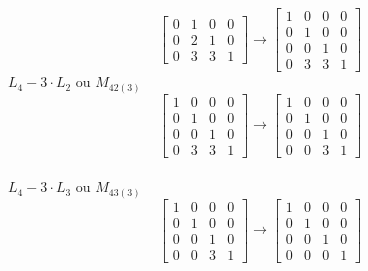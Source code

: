\documentclass[leqno]{article}
\begin{document}
\begin{enumerate}
\begin{sol}
$$\begin{bmatrix}
			0 & 1 & 0 & 0 \\
			0 & 2 & 1 & 0 \\
			0 & 3 & 3 & 1 
		\end{bmatrix} \rightarrow 
		\begin{bmatrix} 
			1 & 0 & 0 & 0 \\
			0 & 1 & 0 & 0 \\
			0 & 0 & 1 & 0 \\
			0 & 3 & 3 & 1 
		\end{bmatrix}$$
		$L_4 - 3 \cdot L_2$ ou $M_{42(3)}$ \\
		$$	\begin{bmatrix} 
			1 & 0 & 0 & 0 \\
			0 & 1 & 0 & 0 \\
			0 & 0 & 1 & 0 \\
			0 & 3 & 3 & 1  
		\end{bmatrix} \rightarrow 
		\begin{bmatrix} 
			1 & 0 & 0 & 0 \\
			0 & 1 & 0 & 0 \\
			0 & 0 & 1 & 0 \\
			0 & 0 & 3 & 1 
		\end{bmatrix}$$\\
		$L_4 - 3 \cdot L_3$ ou $M_{43(3)}$ \\
		$$	\begin{bmatrix} 
			1 & 0 & 0 & 0 \\
			0 & 1 & 0 & 0 \\
			0 & 0 & 1 & 0 \\
			0 & 0 & 3 & 1 
		\end{bmatrix} \rightarrow 
		\begin{bmatrix} 
			1 & 0 & 0 & 0 \\
			0 & 1 & 0 & 0 \\
			0 & 0 & 1 & 0 \\
			0 & 0 & 0 & 1  
		\end{bmatrix}$$\\	
	

\end{sol}
\end{enumerate}
\end{document}
